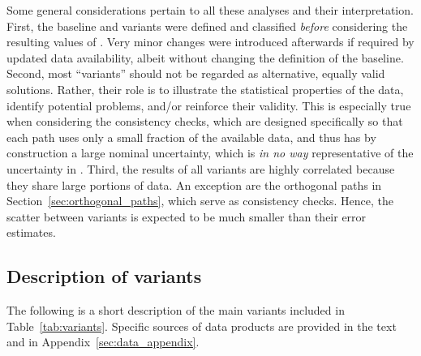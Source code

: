 Some general considerations pertain to all these analyses and their interpretation. First, the baseline and variants were defined and classified {\it before} considering the resulting values of {\Hcst}. Very minor changes were introduced afterwards if required by updated data availability, albeit without changing the definition of the baseline.  
Second, most ``variants'' should not be regarded as alternative, equally valid solutions. Rather, their role is to illustrate the statistical properties of the data, identify potential problems, and/or reinforce their validity. This is especially true when considering the consistency checks, which are designed specifically so that each path uses only a small fraction of the available data, and thus has by construction a large nominal uncertainty, which is \textit{in no way} representative of the uncertainty in {\Hcst}. Third, the results of all variants are highly correlated because they share large portions of data. An exception are the orthogonal paths in Section~\ref{sec:orthogonal_paths}, which serve as consistency checks. Hence, the scatter between variants is expected to be much smaller than their error estimates. 

\subsection {Description of variants}\label{sec:variant_description}

The following is a short description of the main variants included in Table~\ref{tab:variants}. Specific sources of data products are provided in the text and in Appendix~\ref{sec:data_appendix}.

